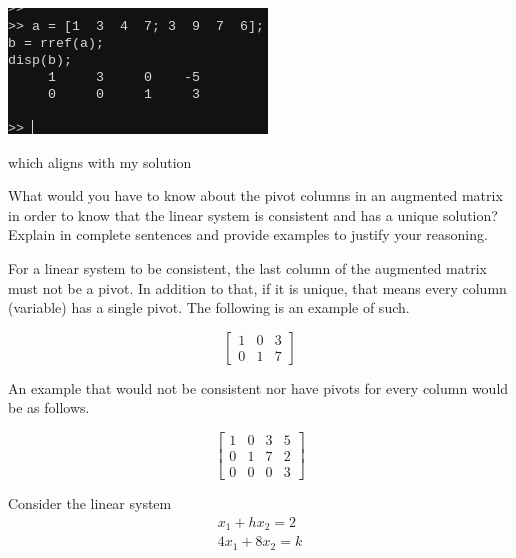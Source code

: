 \documentclass[12pt,letterpaper, onecolumn]{exam}
\begin{document}
\begin{questions}
\begin{solution}
\begin{center}
\begin{center}
                    \includegraphics{matlab-verify}
                \end{center}
                which aligns with my solution
            \end{center}
        \end{solution}
    \pagebreak

    \question What would you have to know about the pivot columns in an augmented
        matrix in order to know that the linear system is consistent and has a
        unique solution? Explain in complete sentences and provide examples to
        justify your reasoning.
    
        \begin{solution}
            For a linear system to be consistent, the last column of the augmented matrix must not be a pivot. In addition to that, if it is unique, that means every column (variable) has a single pivot. The following is an example of such.

            $$
            \begin{bmatrix}
                1 & 0 & 3\\
                0 & 1 & 7
            \end{bmatrix}
            $$

            An example that would not be consistent nor have pivots for every column would be as follows.
            
            $$
            \begin{bmatrix}
                1 & 0 & 3 & 5\\
                0 & 1 & 7 & 2\\
                0 & 0 & 0 & 3
            \end{bmatrix}
            $$
        \end{solution}
    \pagebreak

    \question Consider the linear system\\
        $$
        \begin{matrix}
            x_1 + hx_2 = 2\\
            4x_1 + 8x_2 = k
        \end{matrix}
        $$
        \begin{parts}

\end{parts}
\end{questions}
\end{document}
